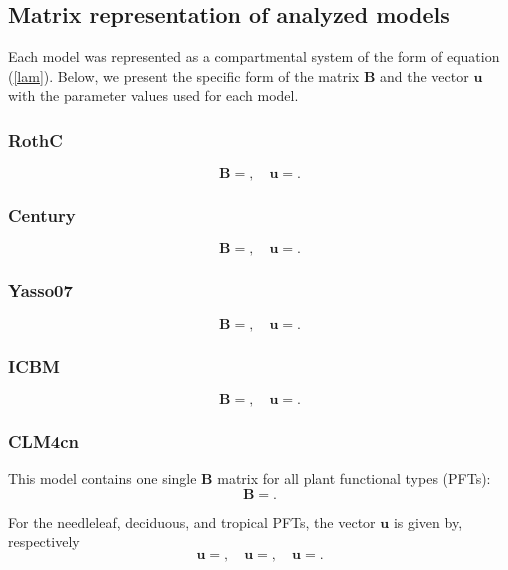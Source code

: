 \documentclass[draft,linenumbers]{agujournal}
\begin{document}
\subsection*{Matrix representation of analyzed models}
Each model was represented as a compartmental system of the form of equation (\ref{lam}). Below, we present the specific form of the matrix $\mathbf{B}$ and the vector ${\bm u}$  with the parameter values used for each model. 

\subsubsection*{RothC}
\begin{equation}
\mathbf{B} =
,
\quad {\bm u} =
.
\end{equation}

\subsubsection*{Century}
\begin{equation}
\mathbf{B} =
,
\quad {\bm u} =
.
\end{equation}

\subsubsection*{Yasso07}
\begin{equation}
\mathbf{B} =
,
\quad {\bm u} =
.
\end{equation}

\subsubsection*{ICBM}
\begin{equation}
\mathbf{B} =
,
\quad {\bm u} =
.
\end{equation}

\subsubsection*{CLM4cn}
This model contains one single $\mathbf{B}$ matrix for all plant functional types (PFTs):
\begin{equation}
\mathbf{B} =
.
\end{equation}

For the needleleaf, deciduous, and tropical PFTs, the vector ${\bm u}$ is given by, respectively
\begin{equation}
{\bm u} =
, 
\quad {\bm u}=
, 
\quad {\bm u}=
.
\end{equation}
\end{document}
